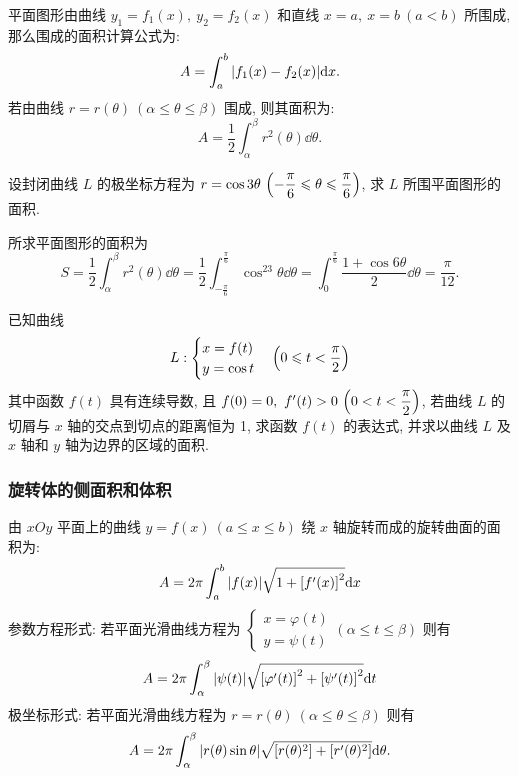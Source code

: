 \begin{theorem}[平面图形面积公式]
    平面图形由曲线 $y_1=f_1(x),~y_2=f_2(x)$ 和直线 $x=a,~x=b~ (a<b)$ 所围成, 那么围成的面积计算公式为:
    $$A=\int_{a}^{b}\qty|f_1(x)-f_2(x)|\dd x.$$
    若由曲线 $r=r(\theta)~ (\alpha\leqslant \theta\leqslant \beta)$ 围成, 则其面积为:
    $$A=\dfrac{1}{2}\int_{\alpha}^{\beta}r^2(\theta)\dd \theta.$$
\end{theorem}

\begin{example}
    设封闭曲线 $L$ 的极坐标方程为 $r=\cos3\theta~ \qty(-\dfrac{\pi}{6}\leqslant \theta\leqslant\dfrac{\pi}{6})$, 求 $L$ 所围平面图形的面积.
\end{example}
\begin{solution}
    所求平面图形的面积为
    $$S=\dfrac{1}{2}\int_{\alpha}^{\beta}r^2(\theta)\dd \theta=\dfrac{1}{2}\int_{-\frac{\pi}{6}}^{\frac{\pi}{6}}\cos^23\theta\dd \theta=\int_{0}^{\frac{\pi}{6}}\dfrac{1+\cos6\theta}{2}\dd \theta=\dfrac{\pi}{12}.$$
\end{solution}

\begin{example}[2012 数一]
    已知曲线 $$L:\begin{cases}
            x=f(t) \\y=\cos t
        \end{cases}\qty(0\leqslant t<\dfrac{\pi}{2})$$
    其中函数 $f(t)$ 具有连续导数, 且 $f(0)=0,~f'(t)>0~ \qty(0<t<\dfrac{\pi}{2})$, 若曲线 $L$ 的切屑与 $x$ 轴的交点到切点的距离恒为 1, 求函数 $f(t)$ 的表达式,
    并求以曲线 $L$ 及 $x$ 轴和 $y$ 轴为边界的区域的面积.
\end{example}

\subsubsection{旋转体的侧面积和体积}

\begin{theorem}[旋转体的侧面积公式]
    由 $xOy$ 平面上的曲线 $y=f(x)~ (a\leqslant x\leqslant b)$ 绕 $x$ 轴旋转而成的旋转曲面的面积为:
    $$A=2\pi\int_{a}^{b}|f(x)|\sqrt{1+\qty[f'(x)]^2 }\dd x$$
    参数方程形式: 若平面光滑曲线方程为 $\begin{cases}
        x=\varphi(t)\\ y=\psi(t)
    \end{cases}(\alpha\leqslant t\leqslant \beta)$ 则有
    $$
    A=2\pi\int_{\alpha}^{\beta} |\psi(t)|\sqrt{\qty[\varphi'(t)]^2+\qty[\psi'(t)]^2} \dd t
    $$
    极坐标形式: 若平面光滑曲线方程为 $r=r(\theta)~(\alpha\leqslant \theta\leqslant \beta)$ 则有 
    $$
    A=2\pi\int_{\alpha}^{\beta} |r(\theta)\sin\theta|\sqrt{\qty[r(\theta)^2]+\qty[r'(\theta)^2]} \dd \theta.
    $$
\end{theorem}

